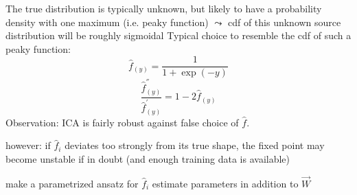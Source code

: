 The true distribution is typically unknown, 
but likely to have a probability density with one maximum (i.e. peaky function)
$\leadsto$ cdf of this unknown source distribution will be roughly sigmoidal
Typical choice to resemble the cdf of such a peaky function:
\begin{equation} \tag{logistic function}
	\widehat{f}_{(y)} = \frac{1}{1 + \exp(-y)}
\end{equation}
\begin{equation}
	\frac{\widehat{f}_{(y)}^{''}}{\widehat{f}_{(y)}^{'}}
	= 1 - 2 \widehat{f}_{(y)}
\end{equation}
Observation: ICA is fairly robust against false choice of $\widehat{f}$.

\begin{itemize}
	\itR however: if $\widehat{f}_i$ deviates too strongly from its true
		shape, the fixed point may become unstable
	\itR if in doubt (and enough training data is available)
	\begin{itemize}
		\itl make a parametrized ansatz for $\widehat{f}_i$
		\itl estimate parameters in addition to $\vec{W}$
	\end{itemize}
\end{itemize}
